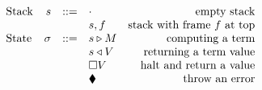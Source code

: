 \documentclass[../plutus-core-specification.tex]{subfiles}
\begin{document}
\begin{figure}[H]
\begin{subfigure}[c]{\linewidth}
    \centering
    \[\begin{array}{lrclr}
        \textrm{Stack} & s      & ::= & \cdot                             & \textrm{empty stack}\\
                       &        &     & s,f                               & \textrm{stack with frame $f$ at top}\\
        \textrm{State} & \sigma & ::= & s \triangleright M                  & \textrm{computing a term}\\
                       &        &     & s \triangleleft V                 & \textrm{returning a term value}\\
                       &        &     & \square V                         & \textrm{halt and return a value}\\
                       &        &     & \blacklozenge{}                        & \textrm{throw an error}
    \end{array}\]

    \label{fig:untyped-ck-frames}
\end{subfigure}


\begin{subfigure}[c]{\linewidth}


\end{subfigure}
\end{figure}
\end{document}
